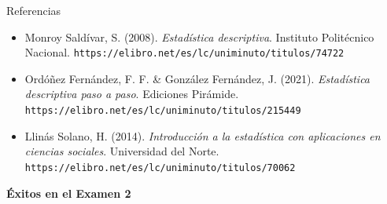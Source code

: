 \documentclass[aspectratio=169,10pt]{beamer}
\begin{document}
\begin{frame}{Referencias}
  \footnotesize
  \begin{itemize}
    \item[{[1]}] Monroy Saldívar, S. (2008). \textit{Estadística descriptiva}.
      Instituto Politécnico Nacional.
      \texttt{https://elibro.net/es/lc/uniminuto/titulos/74722}
    \item[{[2]}] Ordóñez Fernández, F. F. \& González Fernández, J. (2021).
      \textit{Estadística descriptiva paso a paso}. Ediciones Pirámide.
      \texttt{https://elibro.net/es/lc/uniminuto/titulos/215449}
    \item[{[3]}] Llinás Solano, H. (2014). \textit{Introducción a la
      estadística con aplicaciones en ciencias sociales}. Universidad del
      Norte. \texttt{https://elibro.net/es/lc/uniminuto/titulos/70062}
  \end{itemize}

  \vspace{0.35cm}
  \begin{center}
    {\Large\color{uniAzul}\textbf{Éxitos en el Examen 2}}
  \end{center}
\end{frame}
\end{document}
